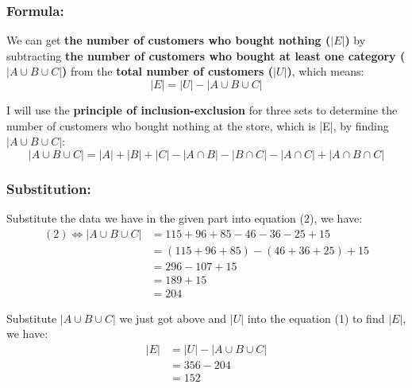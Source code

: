 \documentclass[12pt, a4paper, twoside]{report} %
\begin{document}
\subsubsection*{Formula:}
  We can get \textbf{the number of customers who bought nothing ($|E|$)} by subtracting \textbf{the number of customers who bought at least one category ($|A \cup B \cup C|$)} from the \textbf{total number of customers ($|U|$)}, which means:
  \[
  |E| = |U| - |A \cup B \cup C| \tag{1}
  \]

  I will use the \textbf{principle of inclusion-exclusion} for three sets to determine the number of customers who bought nothing at the store, which is |E|, by finding $|A \cup B \cup C|$:
    \[
    |A \cup B \cup C| = |A| + |B|+|C| - |A \cap B| - |B \cap C| - |A \cap C| + |A \cap B \cap C| \tag{2}
    \]

\subsubsection*{Substitution:}
  Substitute the data we have in the given part into equation (2), we have:
  \begin{align*}
    (2) \Leftrightarrow |A \cup B \cup C| &= 115 + 96 + 85 - 46 - 36 - 25 + 15 \\
                      &= (115 + 96 + 85) - (46 + 36 + 25) + 15 \\
                      &= 296 - 107 + 15 \\
                      &= 189 + 15 \\
                      &= 204
  \end{align*}

  Substitute $|A \cup B \cup C|$ we just got above and $|U|$ into the equation (1) to find $|E|$, we have:
  \begin{align*}
    |E| &= |U| - |A \cup B \cup C| \\
        &= 356 - 204  \\
        &= 152
  \end{align*}
\end{document}
